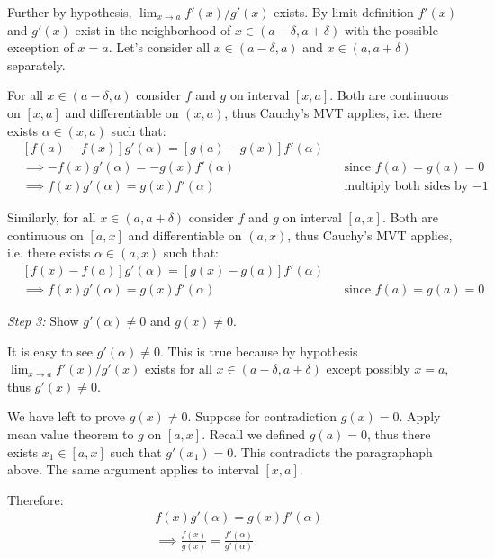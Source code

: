\vs

Further by hypothesis, $\lim_{x\to a}f'(x)/g'(x)$ exists. By limit
definition $f'(x)$ and $g'(x)$ exist in the neighborhood of
$x\in(a-\delta, a+\delta)$ with the possible exception of $x=a$. Let's consider
all $x\in(a-\delta, a)$ and $x\in(a, a+\delta)$ separately.

\vs

For all $x\in(a-\delta, a)$ consider $f$ and $g$ on interval $[x,a]$. Both
are continuous on $[x,a]$ and differentiable on $(x,a)$, thus Cauchy's
MVT applies, i.e. there exists $\alpha\in(x,a)$ such that:
\begin{align*}
  &[f(a)-f(x)]g'(\alpha)=[g(a)-g(x)]f'(\alpha)\\
  &\implies -f(x)g'(\alpha)=-g(x)f'(\alpha)&&\text{since $f(a)=g(a)=0$}\\
  &\implies f(x)g'(\alpha)=g(x)f'(\alpha)&&\text{multiply both sides by $-1$}
\end{align*}

Similarly, for all $x\in(a, a+\delta)$ consider $f$ and $g$ on interval $[a,x]$. Both
are continuous on $[a,x]$ and differentiable on $(a,x)$, thus Cauchy's
MVT applies, i.e. there exists $\alpha\in(a,x)$ such that:
\begin{align*}
  &[f(x)-f(a)]g'(\alpha)=[g(x)-g(a)]f'(\alpha)\\
  &\implies f(x)g'(\alpha)=g(x)f'(\alpha)&&\text{since $f(a)=g(a)=0$}
\end{align*}

\textit{Step 3:} Show $g'(\alpha)\neq0$ and $g(x)\neq0$.

\vs

It is easy to see $g'(\alpha)\neq0$. This is true because by hypothesis
$\lim_{x\to a}f'(x)/g'(x)$ exists for all $x\in(a-\delta, a+\delta)$ except possibly
$x=a$, thus $g'(x)\neq0$.

\vs

We have left to prove $g(x)\neq0$. Suppose for contradiction $g(x)=0$.
Apply mean value theorem to $g$ on $[a,x]$. Recall we defined
$g(a)=0$, thus there exists $x_1\in[a,x]$ such that $g'(x_1)=0$. This
contradicts the paragraphaph above. The same argument applies to
interval $[x,a]$.

\vs

Therefore:
\begin{align*}
  &f(x)g'(\alpha)=g(x)f'(\alpha)\\
  &\implies \frac{f(x)}{g(x)}=\frac{f'(\alpha)}{g'(\alpha)}
\end{align*}


